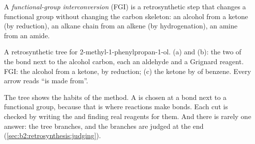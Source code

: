 \begin{definition}\label{def:b2:retrosynthesis:fgi}
A \emph{functional-group interconversion} (FGI) is a
retrosynthetic step that changes a functional group without changing the carbon skeleton: an alcohol
from a ketone (by reduction), an alkane chain from an alkene (by hydrogenation), an amine from an amide.
\end{definition}

\begin{omfigure}
\par\vspace{6pt}

{\small A retrosynthetic tree for 2-methyl-1-phenylpropan-1-ol. (a) and (b): the two  of
the  bond next to the alcohol carbon, each an aldehyde and a Grignard reagent. FGI: the alcohol
from a ketone, by reduction; (c) the ketone by  of benzene. Every arrow
reads ``is made from''.}
\end{omfigure}

The tree shows the habits of the method. A  is chosen at a bond next to a functional
group, because that is where reactions make bonds. Each cut is checked by writing the  and
finding real reagents for them. And there is rarely one answer: the tree branches, and the branches are
judged at the end (\cref{sec:b2:retrosynthesis:judging}).

